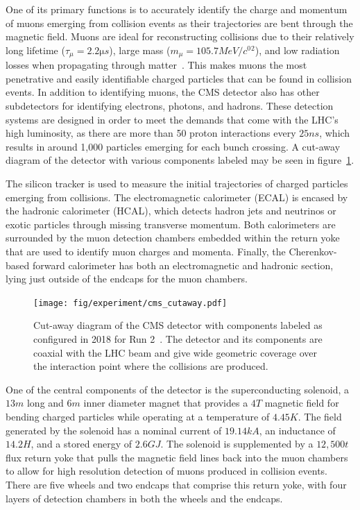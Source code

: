 One of its primary functions is to accurately identify the charge and momentum of muons emerging from collision events as their trajectories are bent through the magnetic field.
Muons are ideal for reconstructing collisions due to their relatively long lifetime ($\tau_\mu=2.2\unit{\micro s}$), large mass ($m_\mu=105.7\unit{MeV/\clight^2}$), and low radiation losses when propagating through matter~\cite{peskin2019}.
This makes muons the most penetrative and easily identifiable charged particles that can be found in collision events.
In addition to identifying muons, the CMS detector also has other subdetectors for identifying electrons, photons, and hadrons.
These detection systems are designed in order to meet the demands that come with the LHC's high luminosity, as there are more than 50 proton interactions every $25\unit{ns}$, which results in around 1,000 particles emerging for each bunch crossing.
A cut-away diagram of the detector with various components labeled may be seen in figure~\ref{fig:CMScut}.

The silicon tracker is used to measure the initial trajectories of charged particles emerging from collisions.
The electromagnetic calorimeter (ECAL) is encased by the hadronic calorimeter (HCAL), which detects hadron jets and neutrinos or exotic particles through missing transverse momentum.
Both calorimeters are surrounded by the muon detection chambers embedded within the return yoke that are used to identify muon charges and momenta.
Finally, the Cherenkov-based forward calorimeter has both an electromagnetic and hadronic section, lying just outside of the endcaps for the muon chambers.

\begin{figure}[htbp]
  \centering
  \texttt{[image: fig/experiment/cms\_cutaway.pdf]}
  \caption[
    Cut-away diagram of the CMS detector with components labeled as configured in 2018 for Run 2.
    The detector and its components are coaxial with the LHC beam and give wide geometric coverage over the interaction point where the collisions are produced.
  ]{
    Cut-away diagram of the CMS detector with components labeled as configured in 2018 for Run 2~\cite{Sakuma:2665537}.
    The detector and its components are coaxial with the LHC beam and give wide geometric coverage over the interaction point where the collisions are produced.
  }
  \label{fig:CMScut}
\end{figure}

One of the central components of the detector is the superconducting solenoid, a $13\unit{m}$ long and $6\unit{m}$ inner diameter magnet that provides a $4\unit{T}$ magnetic field for bending charged particles while operating at a temperature of $4.45\unit{K}$.
The field generated by the solenoid has a nominal current of $19.14\unit{kA}$, an inductance of $14.2\unit{H}$, and a stored energy of $2.6\unit{GJ}$.
The solenoid is supplemented by a $12,500\unit{t}$ flux return yoke that pulls the magnetic field lines back into the muon chambers to allow for high resolution detection of muons produced in collision events.
There are five wheels and two endcaps that comprise this return yoke, with four layers of detection chambers in both the wheels and the endcaps.

